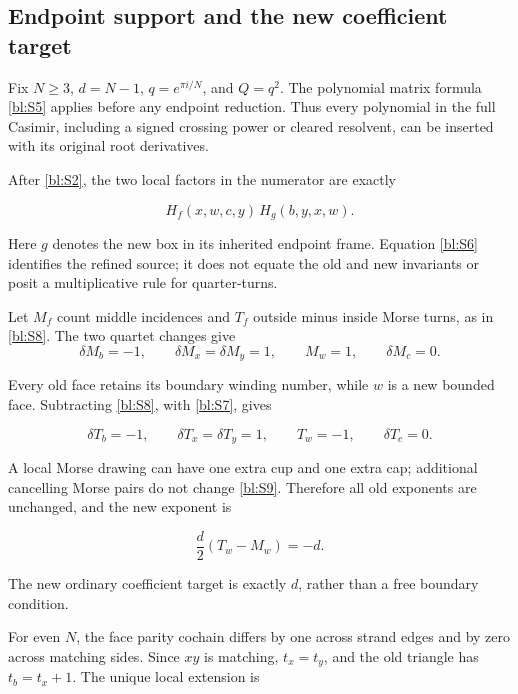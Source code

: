 \subsection{Endpoint support and the new coefficient target}\label{bl:endpoint-support-and-the-new-coefficient-target}

Fix \(N\ge3\), \(d=N-1\), \(q=e^{\pi i/N}\), and \(Q=q^2\).
The polynomial matrix formula \eqref{bl:S5} applies before any endpoint
reduction. Thus every polynomial in the full Casimir, including a
signed crossing power or cleared resolvent, can be inserted with its
original root derivatives.

After \eqref{bl:S2}, the two local factors in the numerator are exactly

\begin{equation}\label{bl:S6}
H_f(x,w,c,y)\,H_g(b,y,x,w).
\end{equation}

Here \(g\) denotes the new box in its inherited endpoint frame. Equation \eqref{bl:S6} identifies the refined source; it does not equate the old and new invariants or posit a multiplicative rule for quarter-turns.

Let \(M_f\) count middle incidences and \(T_f\) outside minus
inside Morse turns, as in \eqref{bl:S8}. The two quartet changes give
\begin{equation}\label{bl:S7}
\delta M_b=-1,\qquad \delta M_x=\delta M_y=1,
\qquad M_w=1,\qquad \delta M_c=0.
\end{equation}

Every old face retains its boundary winding number, while \(w\) is a new bounded face. Subtracting \eqref{bl:S8}, with \eqref{bl:S7}, gives

\begin{equation}\label{bl:S9}
\delta T_b=-1,\qquad \delta T_x=\delta T_y=1,
 \qquad T_w=-1,\qquad \delta T_c=0 .
\end{equation}

A local Morse drawing can have one extra cup and one extra cap; additional cancelling Morse pairs do not change \eqref{bl:S9}. Therefore all old exponents are unchanged, and the new exponent is

\begin{equation}\label{bl:S10}
\frac d2(T_w-M_w)=-d .
\end{equation}

The new ordinary coefficient target is exactly \(d\), rather than a free boundary condition.

For even \(N\), the face parity cochain differs by one across strand edges and by zero across matching sides. Since \(xy\) is matching, \(t_x=t_y\), and the old triangle has \(t_b=t_x+1\). The unique local extension is


